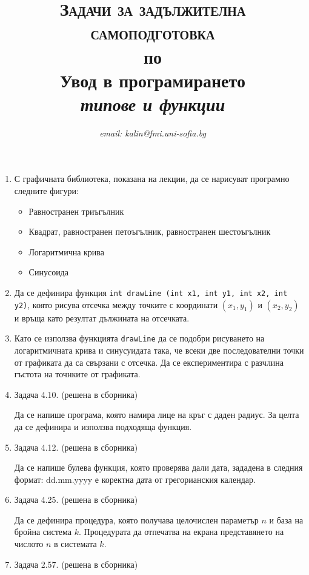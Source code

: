 \documentclass[12pt,a4paper]{article}
\author{\textit{email: kalin@fmi.uni-sofia.bg}}
\title{\textsc{Задачи за задължителна самоподготовка} \\
по \\
Увод в програмирането\\
\textit{типове и функции}}
\begin{document}
\maketitle


\begin{enumerate}

	\item С графичната библиотека, показана на лекции, да се нарисуват програмно следните фигури:

	\begin{itemize}
		\item Равностранен триъгълник
		\item Квадрат, равностранен петоъгълник, равностранен шестоъгълник
		\item Логаритмична крива
		\item Синусоида
	\end{itemize}

	\item Да се дефинира функция \texttt{int drawLine (int x1, int y1, int x2, int y2)}, която рисува отсечка между точките с координати $(x_1,y_1)$ и $(x_2,y_2)$ и връща като резултат дължината на отсечката.

	\item Като се използва функцията \texttt{drawLine} да се подобри рисуването на логаритмичната крива и синусуидата така, че всеки две последователни точки от графиката да са свързани с отсечка. Да се експериментира с разчлина гъстота на точнките от графиката.


	\item Задача 4.10. (решена в сборника)

	Да се напише програма, която намира лице на кръг с даден радиус. За целта да се дефинира и използва подходяща функция.

	\item Задача 4.12. (решена в сборника)

	Да се напише булева функция, която проверява дали дата, зададена в следния формат: dd.mm.yyyy е коректна дата от грегорианския календар. 

	\item Задача 4.25. (решена в сборника)

	Да се дефинира процедура, която получава целочислен параметър $n$ и база на бройна система $k$. Процедурата да отпечатва на екрана представянето на числото $n$ в системата $k$.

\item Задача 2.57. (решена в сборника)


\end{enumerate}
\end{document}

